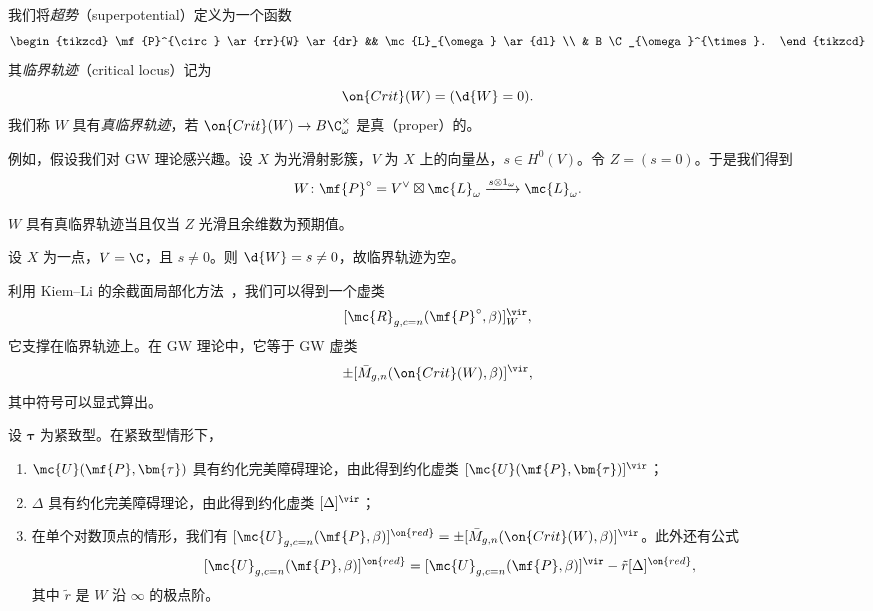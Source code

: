 我们将\textit{超势}（superpotential）定义为一个函数
\begin{equation*}
\begin{tikzcd}
    \mf{P}^{\circ} \ar{rr}{W} \ar{dr} && \mc{L}_{\omega} \ar{dl} \\
    & B \C_{\omega}^{\times}.
\end{tikzcd}
\end{equation*}
其\textit{临界轨迹}（critical locus）记为
\[ \on{Crit}(W) = (\d{W} = 0). \]
我们称 \(W\) 具有\textit{真临界轨迹}，若 \(\on{Crit}(W) \to B\C_{\omega}^{\times}\) 是真（proper）的。

例如，假设我们对 GW 理论感兴趣。设 \(X\) 为光滑射影簇，\(V\) 为 \(X\) 上的向量丛，\(s \in H^0(V)\)。令 \(Z = (s = 0)\)。于是我们得到
\[ W \colon \mf{P}^{\circ} = V^{\vee} \boxtimes \mc{L}_{\omega} \xrightarrow{s \otimes 1_{\omega}} \mc{L}_{\omega}. \]

\begin{lem}
    \(W\) 具有真临界轨迹当且仅当 \(Z\) 光滑且余维数为预期值。
\end{lem}

\begin{exm}
    设 \(X\) 为一点，\(V = \C\)，且 \(s \neq 0\)。则 \(\d{W} = s \neq 0\)，故临界轨迹为空。
\end{exm}

利用 Kiem–Li 的余截面局部化方法~\cite{KiemLi2013}，我们可以得到一个虚类
\[ [\mc{R}_{g, c=n}(\mf{P}^{\circ}, \beta)]_W^{\vir}, \]
它支撑在临界轨迹上。在 GW 理论中，它等于 GW 虚类
\[ \pm [\bar{M}_{g,n}(\on{Crit}(W), \beta)]^{\vir}, \]
其中符号可以显式算出。

\begin{thm}
    设 \(\bm{\tau}\) 为紧致型。在紧致型情形下，
    \begin{enumerate}
        \item \(\mc{U}(\mf{P}, \bm{\tau})\) 具有约化完美障碍理论，由此得到约化虚类 \([\mc{U}(\mf{P}, \bm{\tau})]^{\vir}\)；
        \item \(\Delta\) 具有约化完美障碍理论，由此得到约化虚类 \([\Delta]^{\vir}\)；
        \item 在单个对数顶点的情形，我们有 \([\mc{U}_{g, c=n}(\mf{P}, \beta)]^{\on{red}} = \pm [\bar{M}_{g,n}(\on{Crit}(W), \beta)]^{\vir}\)。此外还有公式
            \[ [\mc{U}_{g, c=n}(\mf{P}, \beta)]^{\on{red}} = [\mc{U}_{g, c=n}(\mf{P}, \beta)]^{\vir} - \tilde{r} [\Delta]^{\on{red}}, \]
            其中 \(\tilde{r}\) 是 \(W\) 沿 \(\infty\) 的极点阶。
    \end{enumerate}
\end{thm}

